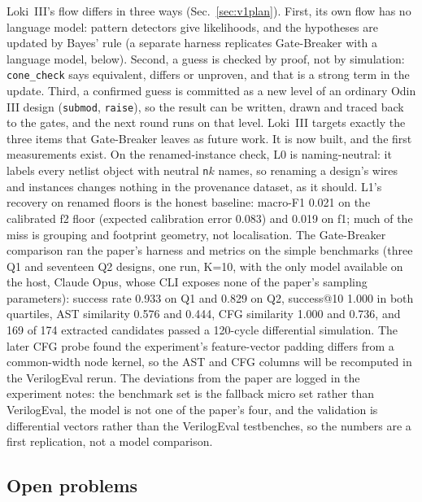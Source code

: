 \documentclass[conference]{IEEEtran}
\newcommand{\code}[1]{\texttt{#1}}
\begin{document}
Loki~III's flow differs in three ways (Sec.~\ref{sec:v1plan}). First, its own flow has no language model:
pattern detectors give likelihoods, and the hypotheses are updated by Bayes' rule (a separate harness replicates Gate-Breaker with a language model, below). Second,
a guess is checked by proof, not by simulation: \code{cone\_check} says equivalent, differs or
unproven, and that is a strong term in the update. Third, a confirmed guess is committed as a
new level of an ordinary Odin III design (\code{submod}, \code{raise}), so the result can be
written, drawn and traced back to the gates, and the next round runs on that level. Loki~III
targets exactly the three items that Gate-Breaker leaves as future work. It is now built, and the first measurements exist. On the renamed-instance check, L0 is naming-neutral: it labels every netlist object with neutral \code{n}$k$ names, so renaming a design's wires and instances changes nothing in the provenance dataset, as it should. L1's recovery on renamed floors is the honest baseline: macro-F1 0.021 on the calibrated f2 floor (expected calibration error 0.083) and 0.019 on f1; much of the miss is grouping and footprint geometry, not localisation. The Gate-Breaker comparison ran the paper's harness and metrics on the simple benchmarks (three Q1 and seventeen Q2 designs, one run, K=10, with the only model available on the host, Claude Opus, whose CLI exposes none of the paper's sampling parameters): success rate 0.933 on Q1 and 0.829 on Q2, success@10 1.000 in both quartiles, AST similarity 0.576 and 0.444, CFG similarity 1.000 and 0.736, and 169 of 174 extracted candidates passed a 120-cycle differential simulation. The later CFG probe found the experiment's feature-vector padding differs from a common-width node kernel, so the AST and CFG columns will be recomputed in the VerilogEval rerun. The deviations from the paper are logged in the experiment notes: the benchmark set is the fallback micro set rather than VerilogEval, the model is not one of the paper's four, and the validation is differential vectors rather than the VerilogEval testbenches, so the numbers are a first replication, not a model comparison.

\subsection{Open problems}
\label{sec:re-open}
\end{document}
